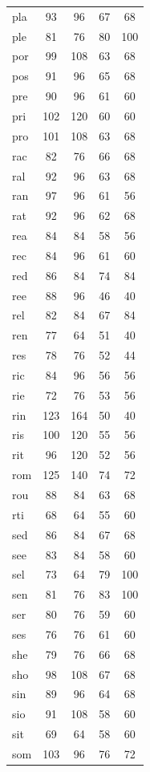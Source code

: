 \documentclass[ms,electronic,twosidetoc,letterpaper,chaptercenter,parttop,lof,lot]{byumsphd}
\begin{document}
\begin{table}
\begin{tabular}{| l | c c | c c |}
  pla & 93 & 96 & 67 & 68 \\
  ple & 81 & 76 & 80 & 100 \\
  por & 99 & 108 & 63 & 68 \\
  pos & 91 & 96 & 65 & 68 \\
  pre & 90 & 96 & 61 & 60 \\
  pri & 102 & 120 & 60 & 60 \\
  pro & 101 & 108 & 63 & 68 \\
  rac & 82 & 76 & 66 & 68 \\
  ral & 92 & 96 & 63 & 68 \\
  ran & 97 & 96 & 61 & 56 \\
  rat & 92 & 96 & 62 & 68 \\
  rea & 84 & 84 & 58 & 56 \\
  rec & 84 & 96 & 61 & 60 \\
  red & 86 & 84 & 74 & 84 \\
  ree & 88 & 96 & 46 & 40 \\
  rel & 82 & 84 & 67 & 84 \\
  ren & 77 & 64 & 51 & 40 \\
  res & 78 & 76 & 52 & 44 \\
  ric & 84 & 96 & 56 & 56 \\
  rie & 72 & 76 & 53 & 56 \\
  rin & 123 & 164 & 50 & 40 \\
  ris & 100 & 120 & 55 & 56 \\
  rit & 96 & 120 & 52 & 56 \\
  rom & 125 & 140 & 74 & 72 \\
  rou & 88 & 84 & 63 & 68 \\
  rti & 68 & 64 & 55 & 60 \\
  sed & 86 & 84 & 67 & 68 \\
  see & 83 & 84 & 58 & 60 \\
  sel & 73 & 64 & 79 & 100 \\
  sen & 81 & 76 & 83 & 100 \\
  ser & 80 & 76 & 59 & 60 \\
  ses & 76 & 76 & 61 & 60 \\
  she & 79 & 76 & 66 & 68 \\
  sho & 98 & 108 & 67 & 68 \\
  sin & 89 & 96 & 64 & 68 \\
  sio & 91 & 108 & 58 & 60 \\
  sit & 69 & 64 & 58 & 60 \\
  som & 103 & 96 & 76 & 72 \\

\end{tabular}
\end{table}
\end{document}

